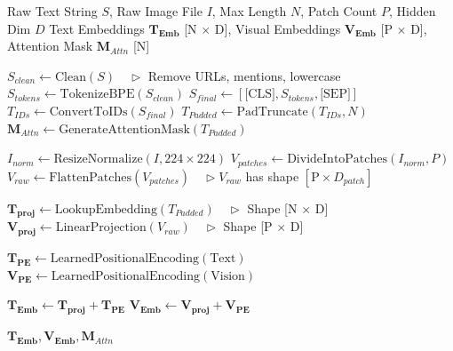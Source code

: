 \documentclass[12pt]{article}
\begin{document}
\begin{algorithm}
\caption{Multimodal Preprocessing for FRCL-GDT}
\label{alg:preprocessing}
\begin{algorithmic}[1]
\REQUIRE Raw Text String $S$, Raw Image File $I$, Max Length $N$, Patch Count $P$, Hidden Dim $D$
\ENSURE Text Embeddings $\mathbf{T_{Emb}}$ [N $\times$ D], Visual Embeddings $\mathbf{V_{Emb}}$ [P $\times$ D], Attention Mask $\mathbf{M}_{Attn}$ [N]
\vspace{0.5cm}

\STATE $S_{clean} \leftarrow \text{Clean}(S) \quad \triangleright$ Remove URLs, mentions, lowercase
\STATE $S_{tokens} \leftarrow \text{TokenizeBPE}(S_{clean})$
\STATE $S_{final} \leftarrow [\text{[CLS]}, S_{tokens}, \text{[SEP]}]$
\STATE $T_{IDs} \leftarrow \text{ConvertToIDs}(S_{final})$
\STATE $T_{Padded} \leftarrow \text{PadTruncate}(T_{IDs}, N)$
\STATE $\mathbf{M}_{Attn} \leftarrow \text{GenerateAttentionMask}(T_{Padded})$

\STATE $I_{norm} \leftarrow \text{ResizeNormalize}(I, 224 \times 224)$
\STATE $V_{patches} \leftarrow \text{DivideIntoPatches}(I_{norm}, P)$
\STATE $V_{raw} \leftarrow \text{FlattenPatches}(V_{patches}) \quad \triangleright V_{raw}$ has shape $[\text{P} \times D_{patch}]$

\STATE $\mathbf{T_{proj}} \leftarrow \text{LookupEmbedding}(T_{Padded}) \quad \triangleright$ Shape [N $\times$ D]
\STATE $\mathbf{V_{proj}} \leftarrow \text{LinearProjection}(V_{raw}) \quad \triangleright$ Shape [P $\times$ D]

\STATE $\mathbf{T_{PE}} \leftarrow \text{LearnedPositionalEncoding}(\text{Text})$
\STATE $\mathbf{V_{PE}} \leftarrow \text{LearnedPositionalEncoding}(\text{Vision})$

\STATE $\mathbf{T_{Emb}} \leftarrow \mathbf{T_{proj}} + \mathbf{T_{PE}}$
\STATE $\mathbf{V_{Emb}} \leftarrow \mathbf{V_{proj}} + \mathbf{V_{PE}}$

\RETURN $\mathbf{T_{Emb}}, \mathbf{V_{Emb}}, \mathbf{M}_{Attn}$
\end{algorithmic}
\end{algorithm}
\end{document}
